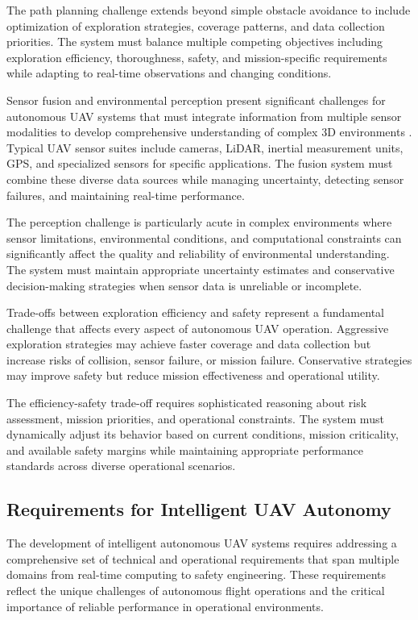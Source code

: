 The path planning challenge extends beyond simple obstacle avoidance to include optimization of exploration strategies, coverage patterns, and data collection priorities. The system must balance multiple competing objectives including exploration efficiency, thoroughness, safety, and mission-specific requirements while adapting to real-time observations and changing conditions.

Sensor fusion and environmental perception present significant challenges for autonomous UAV systems that must integrate information from multiple sensor modalities to develop comprehensive understanding of complex 3D environments \cite{nagai2009uav}. Typical UAV sensor suites include cameras, LiDAR, inertial measurement units, GPS, and specialized sensors for specific applications. The fusion system must combine these diverse data sources while managing uncertainty, detecting sensor failures, and maintaining real-time performance.

The perception challenge is particularly acute in complex environments where sensor limitations, environmental conditions, and computational constraints can significantly affect the quality and reliability of environmental understanding. The system must maintain appropriate uncertainty estimates and conservative decision-making strategies when sensor data is unreliable or incomplete.

Trade-offs between exploration efficiency and safety represent a fundamental challenge that affects every aspect of autonomous UAV operation. Aggressive exploration strategies may achieve faster coverage and data collection but increase risks of collision, sensor failure, or mission failure. Conservative strategies may improve safety but reduce mission effectiveness and operational utility.

The efficiency-safety trade-off requires sophisticated reasoning about risk assessment, mission priorities, and operational constraints. The system must dynamically adjust its behavior based on current conditions, mission criticality, and available safety margins while maintaining appropriate performance standards across diverse operational scenarios.

\subsection{Requirements for Intelligent UAV Autonomy}

The development of intelligent autonomous UAV systems requires addressing a comprehensive set of technical and operational requirements that span multiple domains from real-time computing to safety engineering. These requirements reflect the unique challenges of autonomous flight operations and the critical importance of reliable performance in operational environments.

